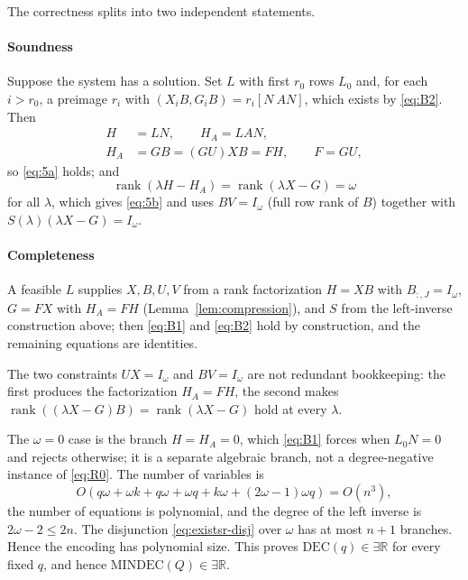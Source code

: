 \documentclass[journal]{IEEEtran}
\theoremstyle{plainn}
\theoremstyle{remark}
\begin{document}
The correctness splits into two independent statements.

\paragraph*{Soundness}
Suppose the system has a solution. Set $L$ with first $r_0$ rows $L_0$ and, for each $i>r_0$, a preimage $r_i$ with $(X_iB,G_iB)=r_i[N\ AN]$, which exists by \eqref{eq:B2}. Then
\begin{equation*}
\begin{aligned}
H&=LN,\qquad H_A=LAN,\\
H_A&=GB=(GU)XB=FH,\qquad F=GU,
\end{aligned}
\end{equation*}
so \eqref{eq:5a} holds; and
\begin{equation*}
\operatorname{rank}(\lambda H-H_A)=\operatorname{rank}(\lambda X-G)=\omega
\end{equation*}
for all $\lambda$, which gives \eqref{eq:5b} and uses $BV=I_\omega$ (full row rank of $B$) together with $S(\lambda)(\lambda X-G)=I_\omega$.

\paragraph*{Completeness}
A feasible $L$ supplies $X,B,U,V$ from a rank factorization $H=XB$ with $B_{:,J}=I_\omega$, $G=FX$ with $H_A=FH$ (Lemma~\ref{lem:compression}), and $S$ from the left-inverse construction above; then \eqref{eq:B1} and \eqref{eq:B2} hold by construction, and the remaining equations are identities.

The two constraints $UX=I_\omega$ and $BV=I_\omega$ are not redundant bookkeeping: the first produces the factorization $H_A=FH$, the second makes $\operatorname{rank}((\lambda X-G)B)=\operatorname{rank}(\lambda X-G)$ hold at every $\lambda$.

The $\omega=0$ case is the branch $H=H_A=0$, which \eqref{eq:B1} forces when $L_0N=0$ and rejects otherwise; it is a separate algebraic branch, not a degree-negative instance of \eqref{eq:R0}. The number of variables is
\begin{equation}
O(q\omega+\omega k+q\omega+\omega q+k\omega+(2\omega-1)\omega q)
=O(n^3),
\end{equation}
the number of equations is polynomial, and the degree of the left inverse is $2\omega-2\le2n$. The disjunction \eqref{eq:existsr-disj} over $\omega$ has at most $n+1$ branches. Hence the encoding has polynomial size. This proves $\mathrm{DEC}(q)\in\exists\mathbb R$ for every fixed $q$, and hence $\mathrm{MINDEC}(Q)\in\exists\mathbb R$.
\end{document}
